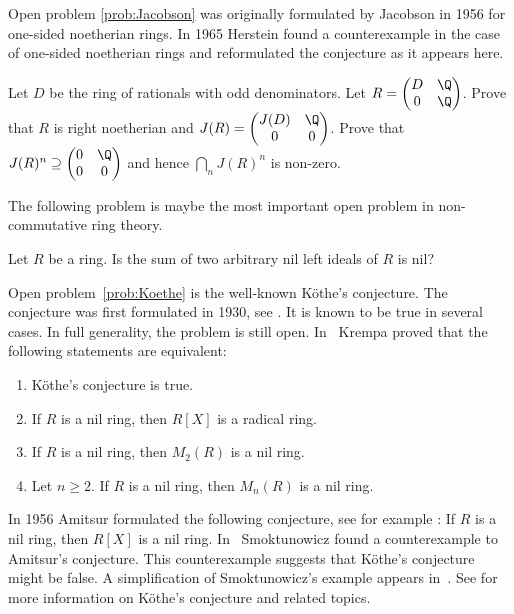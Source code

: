 Open problem \ref{prob:Jacobson} was originally formulated by Jacobson in 1956 \cite{MR0222106} 
for one-sided noetherian rings. In 1965 Herstein \cite{MR188253} found a counterexample
in the case of one-sided noetherian rings 
and reformulated the conjecture as it appears here. 

\begin{exercise}[Herstein]
Let $D$ be the ring of rationals with odd denominators. Let
$R=\begin{pmatrix}
    D & \Q\\
    0 & \Q
\end{pmatrix}$. Prove that $R$ is right noetherian and 
$J(R)=\begin{pmatrix}
J(D) & \Q\\
0 & 0
\end{pmatrix}$. Prove that 
$J(R)^n\supseteq\begin{pmatrix}0&\Q\\0&0\end{pmatrix}$ and hence $\bigcap_nJ(R)^n$ is non-zero. 
\end{exercise}


The following problem is maybe the most important open 
problem in non-commutative ring theory. 

\begin{openproblem}[K\"othe]
\label{prob:Koethe}
Let $R$ be a ring. Is the sum 
of two arbitrary nil left ideals of $R$ is nil?
\end{openproblem}

Open problem~\ref{prob:Koethe} is the well-known K\"othe's conjecture. 
The conjecture was first formulated in 1930, see \cite{MR1545158}. It is known to be true
in several cases. In full generality, the problem is still open. In~\cite{MR306251} 
Krempa proved that
the following statements are equivalent:
\begin{enumerate}
    \item K\"othe's conjecture is true.  
    \item If $R$ is a nil ring, then $R[X]$ is a radical ring. 
    \item If $R$ is a nil ring, then $M_2(R)$ is a nil ring. 
    \item Let $n\geq2$. If $R$ is a nil ring, then $M_n(R)$ is a nil ring. 
\end{enumerate}

In 1956 Amitsur formulated the following conjecture, see for example
\cite{MR0347873}: If $R$ is a nil ring, then $R[X]$ is a nil ring. In~\cite{MR1793911} 
Smoktunowicz found a counterexample to Amitsur's conjecture. 
This counterexample suggests that K\"othe's conjecture might be false. 
A simplification of Smoktunowicz's example
appears in~\cite{MR3169522}. See \cite{MR1879880,MR2275597} for more
information on K\"othe's conjecture and related topics. 

